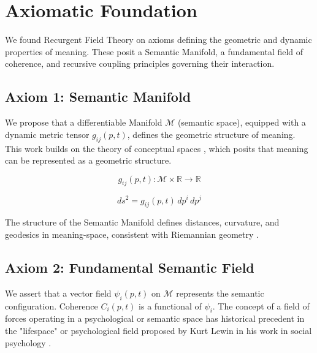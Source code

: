 \chapter{Axiomatic Foundation}
\label{ch:axiomatic_foundation}

We found Recurgent Field Theory on axioms defining the geometric and dynamic properties of meaning. These posit a Semantic Manifold, a fundamental field of coherence, and recursive coupling principles governing their interaction.


\section{Axiom 1: Semantic Manifold}
\label{sec:axiom_1}

We propose that a differentiable Manifold \(\mathcal{M}\) (semantic space), equipped with a dynamic metric tensor \(g_{ij}(p,t)\), defines the geometric structure of meaning. This work builds on the theory of conceptual spaces \autocite{Gardenfors2000}, which posits that meaning can be represented as a geometric structure.

\begin{equation}
g_{ij}(p,t) : \mathcal{M} \times \mathbb{R} \rightarrow \mathbb{R}
\end{equation}

\begin{equation}
ds^2 = g_{ij}(p,t) \, dp^i \, dp^j
\end{equation}

The structure of the Semantic Manifold defines distances, curvature, and geodesics in meaning-space, consistent with Riemannian geometry \autocite{Riemann1868}.


\section{Axiom 2: Fundamental Semantic Field}
\label{sec:axiom_2}

We assert that a vector field \(\psi_i(p,t)\) on \(\mathcal{M}\) represents the semantic configuration. Coherence \(C_i(p,t)\) is a functional of \(\psi_i\). The concept of a field of forces operating in a psychological or semantic space has historical precedent in the "lifespace" or psychological field proposed by Kurt Lewin in his work in social psychology \autocite{Lewin1951}.

